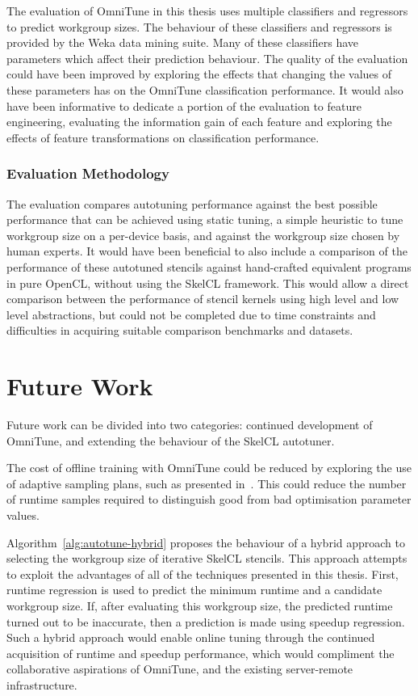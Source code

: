 The evaluation of OmniTune in this thesis uses multiple classifiers
and regressors to predict workgroup sizes. The behaviour of these
classifiers and regressors is provided by the Weka data mining
suite. Many of these classifiers have parameters which affect their
prediction behaviour. The quality of the evaluation could have been
improved by exploring the effects that changing the values of these
parameters has on the OmniTune classification performance. It would
also have been informative to dedicate a portion of the evaluation to
feature engineering, evaluating the information gain of each feature
and exploring the effects of feature transformations on classification
performance.


\subsubsection{Evaluation Methodology}

The evaluation compares autotuning performance against the best
possible performance that can be achieved using static tuning, a
simple heuristic to tune workgroup size on a per-device basis, and
against the workgroup size chosen by human experts. It would have been
beneficial to also include a comparison of the performance of these
autotuned stencils against hand-crafted equivalent programs in pure
OpenCL, without using the SkelCL framework. This would allow a direct
comparison between the performance of stencil kernels using high level
and low level abstractions, but could not be completed due to time
constraints and difficulties in acquiring suitable comparison
benchmarks and datasets.


\section{Future Work}

Future work can be divided into two categories: continued development
of OmniTune, and extending the behaviour of the SkelCL autotuner.

The cost of offline training with OmniTune could be reduced by
exploring the use of adaptive sampling plans, such as presented
in~\cite{Leather2009}. This could reduce the number of runtime samples
required to distinguish good from bad optimisation parameter values.

Algorithm~\ref{alg:autotune-hybrid} proposes the behaviour of a hybrid
approach to selecting the workgroup size of iterative SkelCL
stencils. This approach attempts to exploit the advantages of all of
the techniques presented in this thesis. First, runtime regression is
used to predict the minimum runtime and a candidate workgroup
size. If, after evaluating this workgroup size, the predicted runtime
turned out to be inaccurate, then a prediction is made using speedup
regression. Such a hybrid approach would enable online tuning through
the continued acquisition of runtime and speedup performance, which
would compliment the collaborative aspirations of OmniTune, and the
existing server-remote infrastructure.


